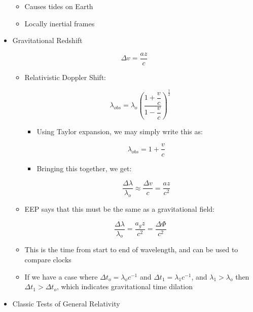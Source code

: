 \begin{itemize}
\begin{itemize}
      \item Causes tides on Earth

      \item Locally inertial frames

    \end{itemize}

  \item Gravitational Redshift

    $$\Delta v=\frac{az}{c}$$

    \begin{itemize}

      \item Relativistic Doppler Shift:

        $$\lambda_{obs}=\lambda_o\left( \frac{1+\dfrac{v}{c}}{1-\dfrac{v}{c}} \right)^{\frac{1}{2}}$$

        \begin{itemize}

          \item Using Taylor expansion, we may simply write this as:

            $$\lambda_{obs}=1+\frac{v}{c}$$

          \item Bringing this together, we get:

            $$\frac{\Delta\lambda}{\lambda_o}\approx\frac{\Delta v}{c}=\frac{az}{c^2}$$

        \end{itemize}

      \item EEP says that this must be the same as a gravitational field:

        $$\frac{\Delta\lambda}{\lambda_o}=\frac{a_gz}{c^2}=\frac{\Delta\Phi}{c^2}$$

      \item This is the time from start to end of wavelength, and can be used to compare clocks

      \item If we have a case where $\Delta t_o=\lambda_oc^{-1}$ and $\Delta t_1=\lambda_1c^{-1}$, and $\lambda_1>\lambda_o$ then $\Delta t_1>\Delta t_o$, which indicates gravitational time dilation

    \end{itemize}

  \item Classic Tests of General Relativity

    \begin{enumerate}


\end{enumerate}
\end{itemize}
